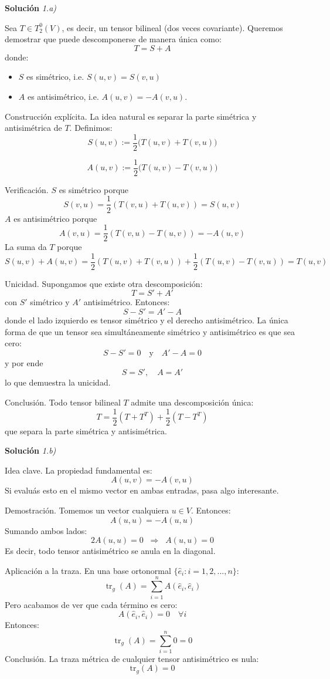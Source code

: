 \documentclass[11pt,spanish]{article}
\DeclareMathOperator{\Tr}{tr}
\begin{document}
\vspace{0.5cm}
{\bf Soluci\'on }{\em 1.a)}
\vspace{0.5cm}

Sea $T \in T^0_2(V) $, es decir, un tensor bilineal (dos veces covariante). 
Queremos demostrar que puede descomponerse de manera única como:
$$
T = S + A
$$
donde:
\begin{itemize}
\item $S$ es simétrico, i.e. $S(u,v) = S(v,u)$
\item $A$ es antisimétrico, i.e. $A(u,v) = -A(v,u)$.
\end{itemize}

Construcción explícita.
La idea natural es separar la parte simétrica y antisimétrica de $T$. 
Definimos:
$$
S(u,v) := \frac{1}{2}\big(T(u,v) + T(v,u)\big)
$$

$$
A(u,v) := \frac{1}{2}\big(T(u,v) - T(v,u)\big)
$$

Verificación. 
$S$ es simétrico porque
$$
S(v,u) = \frac{1}{2}(T(v,u) + T(u,v)) = S(u,v)
$$
$A$ es antisimétrico porque
$$
A(v,u) = \frac{1}{2}(T(v,u) - T(u,v)) = -A(u,v)
$$
La suma da $T$ porque
$$
S(u,v) + A(u,v) = \frac{1}{2}(T(u,v)+T(v,u)) + \frac{1}{2}(T(u,v)-T(v,u)) = T(u,v)
$$

Unicidad.
Supongamos que existe otra descomposición:
$$
T = S' + A'
$$
con $S'$ simétrico y $A'$ antisimétrico.
Entonces:
$$
S - S' = A' - A
$$
donde el lado izquierdo es tensor simétrico y el derecho antisimétrico.
La única forma de que un tensor sea simultáneamente simétrico y antisimétrico es que sea cero:
$$
S - S' = 0 \quad \text{y} \quad A' - A = 0
$$
y por ende
$$
S = S', \quad A = A'
$$
lo que demuestra la unicidad.

Conclusión.
Todo tensor bilineal $T$ admite una descomposición única:
$$
T = \frac{1}{2}(T + T^T) + \frac{1}{2}(T - T^T)
$$
que separa la parte simétrica y antisimétrica.

\vspace{0.5cm}
{\bf Soluci\'on }{\em 1.b)}
\vspace{0.5cm}

Idea clave.
La propiedad fundamental es:
$$
A(u,v) = -A(v,u)
$$
Si evaluás esto en el mismo vector en ambas entradas, pasa algo interesante.

Demostración.
Tomemos un vector cualquiera $u \in V$.
Entonces:
$$
A(u,u) = -A(u,u)
$$
Sumando ambos lados:
$$
2A(u,u) = 0 \;\; \Rightarrow \;\; A(u,u) = 0
$$
Es decir, todo tensor antisimétrico se anula en la diagonal.

Aplicación a la traza.
En una base ortonormal $\{\hat e_i:i=1,2,...,n\}$:
$$
\Tr_g(A) = \sum_{i=1}^n A(\hat e_i, \hat e_i)
$$
Pero acabamos de ver que cada término es cero:
$$
A(\hat e_i, \hat e_i) = 0 \quad \forall i
$$
Entonces:
$$
\Tr_g(A) = \sum_{i=1}^n 0 = 0
$$
Conclusión.
La traza métrica de cualquier tensor antisimétrico es nula:
$$
\boxed{\mathrm{tr}_g(A) = 0}
$$
\end{document}

